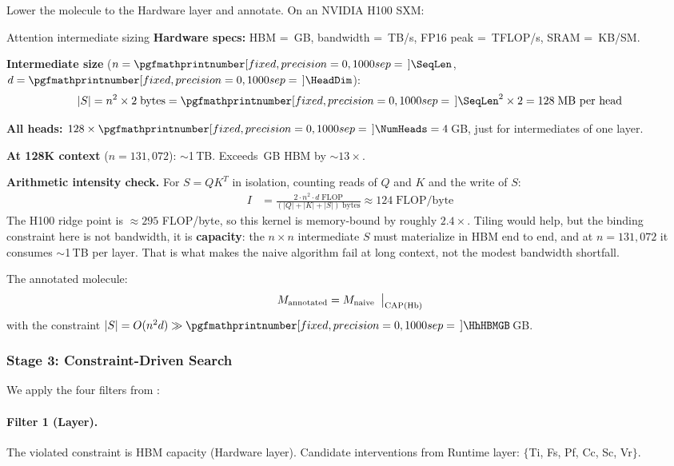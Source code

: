 \documentclass[10pt,twocolumn]{article}
\newcommand{\cval}[1]{\pgfmathprintnumber[fixed, precision=1, 1000 sep={\,}]{#1}}
\newcommand{\cvalint}[1]{\pgfmathprintnumber[fixed, precision=0, 1000 sep={\,}]{#1}}
\newcommand{\AttnIntermMB}{128}       %
\newcommand{\AttnTotalGB}{4}          %
\begin{document}
Lower the molecule to the Hardware layer and annotate. On an NVIDIA H100 SXM:

\begin{napkinmath}{Attention intermediate sizing}
\textbf{Hardware specs:} HBM = \cvalint{\HhHBMGB}\,GB, bandwidth = \cval{\HhBWTBs}\,TB/s, FP16 peak = \cvalint{\HhPeakTFLOPS}\,TFLOP/s, SRAM = \cvalint{\SRAMperSMKB}\,KB/SM.

\textbf{Intermediate size} ($n = \cvalint{\SeqLen}$, $d = \cvalint{\HeadDim}$):
\[
|S| = n^2 \times 2\;\text{bytes} = \cvalint{\SeqLen}^2 \times 2 = \AttnIntermMB{}\;\text{MB per head}
\]

\textbf{All heads:} $\AttnIntermMB{} \times \cvalint{\NumHeads} = \AttnTotalGB{}$\,GB, just for intermediates of one layer.

\textbf{At 128K context} ($n = 131{,}072$): ${\sim}$1\,TB. Exceeds \cvalint{\HhHBMGB}\,GB HBM by ${\sim}13\times$.

\textbf{Arithmetic intensity check.} For $S = QK^T$ in isolation, counting reads of $Q$ and $K$ and the write of $S$:
\begin{align*}
I &= \frac{2 \cdot n^2 \cdot d\;\text{FLOP}}{(|Q| + |K| + |S|)\;\text{bytes}} \approx 124\;\text{FLOP/byte}
\end{align*}
The H100 ridge point is $\approx 295$ FLOP/byte, so this kernel is memory-bound by roughly $2.4\times$. Tiling would help, but the binding constraint here is not bandwidth, it is \textbf{capacity}: the $n \times n$ intermediate $S$ must materialize in HBM end to end, and at $n = 131{,}072$ it consumes $\sim$1\,TB per layer. That is what makes the naive algorithm fail at long context, not the modest bandwidth shortfall.
\end{napkinmath}

The annotated molecule:
\begin{equation}
M_{\text{annotated}} = M_{\text{naive}} \;\bigm|_{\text{CAP}(\text{Hb})}
\end{equation}
with the constraint $|S| = O(n^2 d) \gg \cvalint{\HhHBMGB}$\,GB.

\subsubsection{Stage 3: Constraint-Driven Search}

We apply the four filters from :

\paragraph{Filter 1 (Layer).} The violated constraint is HBM capacity (Hardware layer). Candidate interventions from Runtime layer: $\{$Ti, Fs, Pf, Cc, Sc, Vr$\}$.
\end{document}
